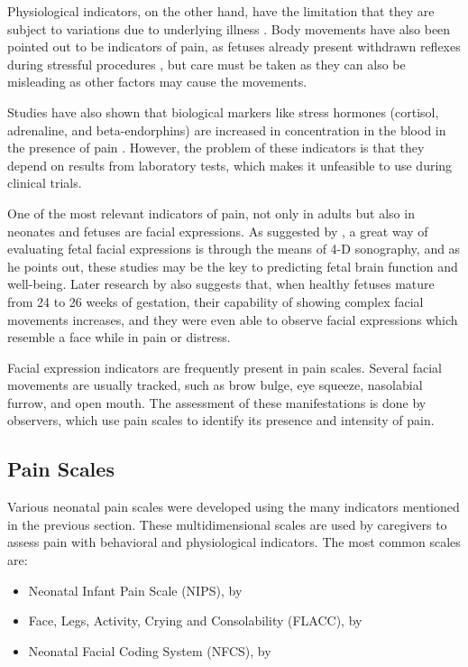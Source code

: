 Physiological indicators, on the other hand, have the limitation that they are subject to variations due to underlying illness \citep{sweet1998physiological}. Body movements have also been pointed out to be indicators of pain, as fetuses already present withdrawn reflexes during stressful procedures \citep{Zimmermann1991}, but care must be taken as they can also be misleading as other factors may cause the movements.

Studies have also shown that biological markers like stress hormones (cortisol, adrenaline, and beta-endorphins) are increased in concentration in the blood in the presence of pain \citep{giannakoulopoulos1994fetal}. However, the problem of these indicators is that they depend on results from laboratory tests, which makes it unfeasible to use during clinical trials.

One of the most relevant indicators of pain, not only in adults but also in neonates and fetuses are facial expressions. As suggested by \cite{Yan2006}, a great way of evaluating fetal facial expressions is through the means of 4-D sonography, and as he points out, these studies may be the key to predicting fetal brain function and well-being. Later research by \cite{Reissland2011, Reissland2013} also suggests that, when healthy fetuses mature from 24 to 26 weeks of gestation, their capability of showing complex facial movements increases, and they were even able to observe facial expressions which resemble a face while in pain or distress.

Facial expression indicators are frequently present in pain scales. Several facial movements are usually tracked, such as brow bulge, eye squeeze, nasolabial furrow, and open mouth. The assessment of these manifestations is done by observers, which use pain scales to identify its presence and intensity of pain.

\subsection{Pain Scales}

Various neonatal pain scales were developed using the many indicators mentioned in the previous section. These multidimensional scales are used by caregivers to assess pain with behavioral and physiological indicators. The most common scales are:

\begin{itemize}
    \item Neonatal Infant Pain Scale (NIPS), by \cite{Lawrence1993}
    \item Face, Legs, Activity, Crying and Consolability (FLACC), by \cite{Merkel1996}
    \item Neonatal Facial Coding System (NFCS), by \cite{Grunau1998}
\end{itemize}


